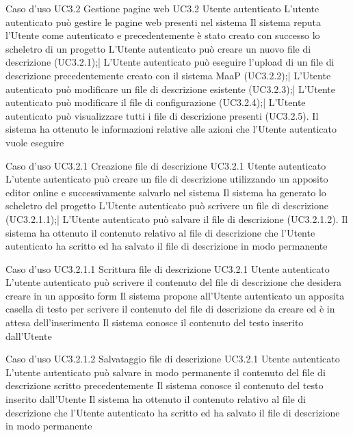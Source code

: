 \UCtitle
{Caso d'uso UC3.2}
{Gestione pagine web}
\UC
{UC3.2}
{Utente autenticato}
{L'utente autenticato può gestire le pagine web presenti nel sistema}
{Il sistema reputa l'Utente come autenticato e precedentemente è stato creato con successo lo scheletro di un progetto}
\scenario
{L'Utente autenticato può creare un nuovo file di descrizione (UC3.2.1);|
L'Utente autenticato può eseguire l'upload di un file di descrizione precedentemente creato con il sistema MaaP (UC3.2.2);|
L'Utente autenticato può modificare un file di descrizione esistente (UC3.2.3);|
L'Utente autenticato può modificare il file di configurazione (UC3.2.4);|
L'Utente autenticato può visualizzare tutti i file di descrizione presenti (UC3.2.5).
}
\post
{Il sistema ha ottenuto le informazioni relative alle azioni che l'Utente autenticato vuole eseguire}


\UCtitle
{Caso d'uso UC3.2.1}
{Creazione file di descrizione}
\UC
{UC3.2.1}
{Utente autenticato}
{L'utente autenticato può creare un file di descrizione utilizzando un apposito editor online e successivamente salvarlo nel sistema}
{Il sistema ha generato lo scheletro del progetto}
\scenario
{L'Utente autenticato può scrivere un file di descrizione (UC3.2.1.1);|
L'Utente autenticato può salvare il file di descrizione (UC3.2.1.2).
}
\post
{Il sistema ha ottenuto il contenuto relativo al file di descrizione che l'Utente autenticato ha scritto ed ha salvato il file di descrizione in modo permanente}

\UCtitle
{Caso d'uso UC3.2.1.1}
{Scrittura file di descrizione}
\UC
{UC3.2.1}
{Utente autenticato}
{L'utente autenticato può scrivere il contenuto del file di descrizione che desidera creare in un apposito form}
{Il sistema propone all'Utente autenticato un apposita casella di testo per scrivere il contenuto del file di descrizione da creare ed è in attesa dell'inserimento}
\post
{Il sistema conosce il contenuto del testo inserito dall'Utente}

\UCtitle
{Caso d'uso UC3.2.1.2}
{Salvataggio file di descrizione}
\UC
{UC3.2.1}
{Utente autenticato}
{L'utente autenticato può salvare in modo permanente il contenuto del file di descrizione scritto precedentemente}
{Il sistema conosce il contenuto del testo inserito dall'Utente}
\post
{Il sistema ha ottenuto il contenuto relativo al file di descrizione che l'Utente autenticato ha scritto ed ha salvato il file di descrizione in modo permanente}

